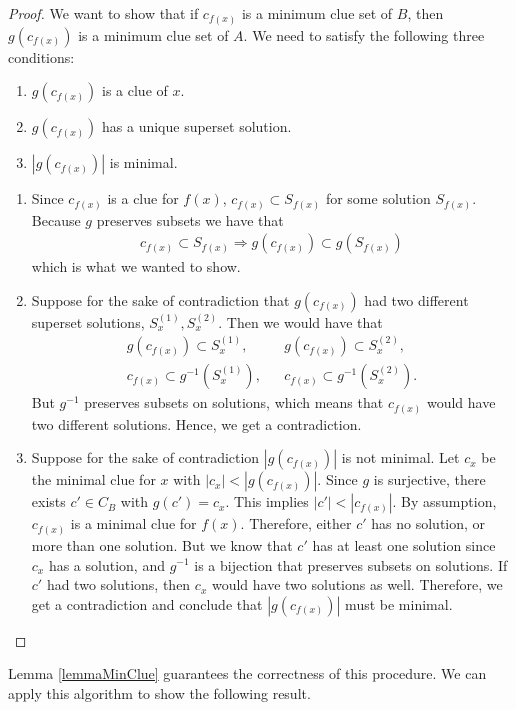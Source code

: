 \documentclass[runningheads,a4paper]{llncs}
\begin{document}
\begin{proof}
We want to show that if $c_{f(x)}$ is a minimum clue set of $B$, then $g(c_{f(x)})$ is a minimum clue set of $A$. We need to satisfy the following three conditions:
\begin{enumerate}
\item $g(c_{f(x)})$ is a clue of $x$. 
\item $g(c_{f(x)})$ has a unique superset solution.
\item $|g(c_{f(x)})|$ is minimal.
\end{enumerate}

\begin{enumerate}
\item Since $c_{f(x)}$ is a clue for $f(x)$, $c_{f(x)} \subset S_{f(x)}$ for some solution $S_{f(x)}$. Because $g$ preserves subsets we have that 
\begin{align*} c_{f(x)} \subset S_{f(x)} \Rightarrow g(c_{f(x)}) \subset g(S_{f(x)}) \end{align*}
which is what we wanted to show. 
\item Suppose for the sake of contradiction that $g(c_{f(x)})$ had two different superset solutions, $S_x^{(1)}, S_x^{(2)}$. Then we would have that
\begin{align*}
g(c_{f(x)}) \subset S_x^{(1)}, && g(c_{f(x)}) \subset S_x^{(2)}, \\
c_{f(x)} \subset g^{-1}(S_x^{(1)}), && c_{f(x)} \subset g^{-1}(S_x^{(2)}).
\end{align*}
But $g^{-1}$ preserves subsets on solutions, which means that $c_{f(x)}$ would have two different solutions. Hence, we get a contradiction. 
\item Suppose for the sake of contradiction $|g(c_{f(x)})|$ is not minimal. Let $c_x$ be the minimal clue for $x$ with $|c_x| < |g(c_{f(x)})|$. Since $g$ is surjective, there exists $c' \in C_B$ with $g(c') = c_x$. This implies $|c'| < |c_{f(x)}|$. By assumption, $c_{f(x)}$ is a minimal clue for $f(x)$. Therefore, either $c'$ has no solution, or more than one solution. But we know that $c'$ has at least one solution since $c_x$ has a solution, and $g^{-1}$ is a bijection that preserves subsets on solutions. If $c'$ had two solutions, then $c_x$ would have two solutions as well. Therefore, we get a contradiction and conclude that $|g(c_{f(x)})|$ must be minimal.
\end{enumerate}
\end{proof}

Lemma \ref{lemmaMinClue} guarantees the correctness of this procedure. We can apply this algorithm to show the following result. 
\end{document}
